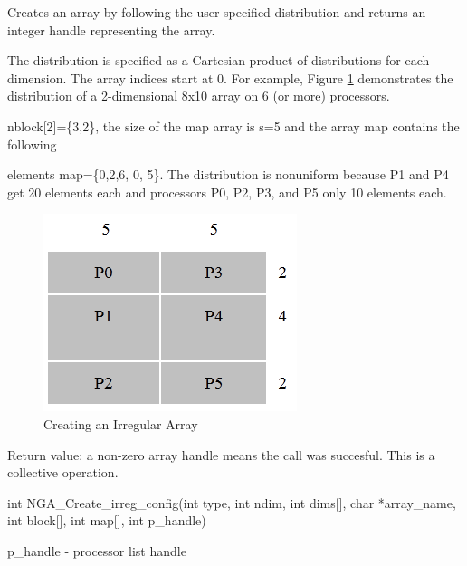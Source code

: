 \documentclass[12pt]{article}
\begin{document}
\begin{desc}

  Creates an array by following the user-specified distribution and
  returns an integer handle representing the array.

  The distribution is specified as a Cartesian product of
  distributions for each dimension. The array indices start at 0.
For example, Figure \ref{crirreg} demonstrates the distribution of a
2-dimensional 8x10 array on 6 (or more) processors.

nblock[2]=\{3,2\}, the size of the map array is s=5 and the array map contains the following

  elements map=\{0,2,6, 0, 5\}. The distribution is nonuniform because
  P1 and P4 get 20 elements each and processors P0, P2, P3, and P5 only
  10 elements each.


\begin{figure}
\includegraphics{CrIrreg}
\centering
\caption{Creating an Irregular Array}
\label{crirreg}
\end{figure}

  Return value: a non-zero array handle means the call was succesful.
  This is a collective operation.

\end{desc}



\begin{capi}
\begin{ccode}
int NGA_Create_irreg_config(int type, int ndim, int dims[],
                            char *array_name, int block[], int map[],
                            int p_handle)
\end{ccode}
\begin{funcargs}
\end{funcargs}
   p_handle               - processor list handle
\end{capi}
\end{document}
